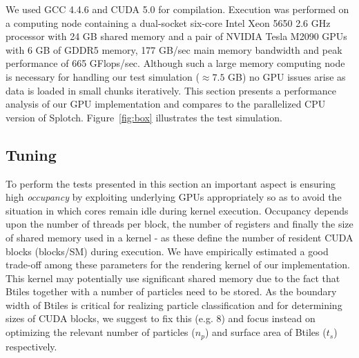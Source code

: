 \documentclass[1p]{elsarticle}
\begin{document}
We used GCC 4.4.6 and CUDA 5.0 for compilation. Execution was performed on a computing node containing a dual-socket six-core Intel Xeon 5650 2.6 GHz processor with 24 GB shared memory and a pair of NVIDIA Tesla M2090 GPUs with 6 GB of GDDR5 memory, 177 GB/sec main memory bandwidth and peak performance of 665 GFlops/sec. Although such a large memory computing node is necessary for handling our test simulation ($\approx 7.5$ GB) no GPU issues arise as data is loaded in small chunks iteratively. This section presents a performance analysis of our GPU implementation and compares to the parallelized CPU version of Splotch. Figure~\ref{fig:box} illustrates the test simulation.

\subsection{Tuning}
\label{sec:gpuperf}
To perform the tests presented in this section an important aspect is ensuring high {\it occupancy} by exploiting underlying GPUs appropriately so as to avoid the situation in which cores remain idle during kernel execution. Occupancy depends upon the number of threads per block, the number of registers and finally the size of shared memory used in a kernel - as these define the number of resident CUDA blocks (blocks/SM) during execution. We have empirically estimated a good trade-off among these parameters for the rendering kernel of our implementation. This kernel may potentially use significant shared memory due to the fact that Btiles together with a number of particles need to be stored. As the boundary width of Btiles is critical for realizing particle classification and for determining sizes of CUDA blocks, we suggest to fix this (e.g. 8) and focus instead on optimizing the relevant number of particles ($n_p$) and surface area of Btiles ($t_s$) respectively.
\end{document}
